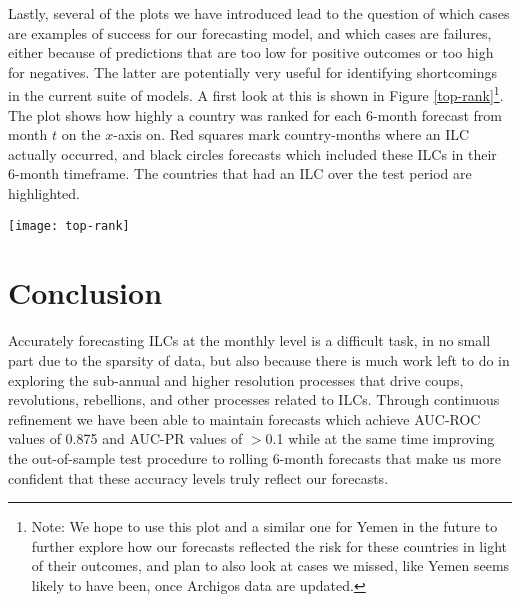 \documentclass[pdftex,11pt]{article}
\begin{document}
Lastly, several of the plots we have introduced lead to the question of which cases are examples of success for our forecasting model, and which cases are failures, either because of predictions that are too low for positive outcomes or too high for negatives. The latter are potentially very useful for identifying  shortcomings in the current suite of models. A first look at this is shown in Figure \ref{top-rank}\footnote{Note: We hope to use this plot and a similar one for Yemen in the future to further explore how our forecasts reflected the risk for these countries in light of their outcomes, and plan to also look at cases we missed, like Yemen seems likely to have been, once Archigos data are updated. }. The plot shows how highly a country was ranked for each 6-month forecast from month $t$ on the $x$-axis on. Red squares mark country-months where an ILC actually occurred, and black circles forecasts which included these ILCs in their 6-month timeframe. The countries that had an ILC over the test period are highlighted. 

\begin{figure*}
  \centering
  \caption{Forecast rank evolution over rolling 6-month test forecasts. Red squares mark country-months when ILCs occurred, black circles mark forecasts which included these ILCs.}
  \label{top-rank}
  \texttt{[image: top-rank]}
\end{figure*}

\section{Conclusion}

Accurately forecasting ILCs at the monthly level is a difficult task, in no small part due to the sparsity of data, but also because there is much work left to do in exploring the sub-annual and higher resolution processes that drive coups, revolutions, rebellions, and other processes related to ILCs. Through continuous refinement we have been able to maintain forecasts which achieve AUC-ROC values of 0.875 and AUC-PR values of $>$0.1 while at the same time improving the out-of-sample test procedure to rolling 6-month forecasts that make us more confident that these accuracy levels truly reflect our forecasts. 
\end{document}
